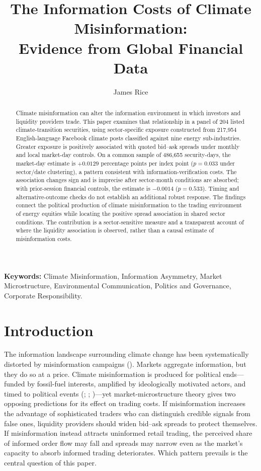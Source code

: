 \documentclass{article}
\title{The Information Costs of Climate Misinformation: \\\large Evidence from Global Financial Data}
\author[1]{James Rice}
\affil[1]{Department of Government, University of Essex}
\author{}
\date{}
\theoremstyle{plain}
\begin{document}
\maketitle

\begin{abstract}

Climate misinformation can alter the information environment in which investors and liquidity providers trade. This paper examines that relationship in a panel of 204 listed climate-transition securities, using sector-specific exposure constructed from 217,954 English-language Facebook climate posts classified against nine energy sub-industries. Greater exposure is positively associated with quoted bid--ask spreads under monthly and local market-day controls. On a common sample of 486,655 security-days, the market-day estimate is $+0.0129$ percentage points per index point ($p=0.033$ under sector/date clustering), a pattern consistent with information-verification costs. The association changes sign and is imprecise after sector-month conditions are absorbed; with prior-session financial controls, the estimate is $-0.0014$ ($p=0.533$). Timing and alternative-outcome checks do not establish an additional robust response. The findings connect the political production of climate misinformation to the trading environment of energy equities while locating the positive spread association in shared sector conditions. The contribution is a sector-sensitive measure and a transparent account of where the liquidity association is observed, rather than a causal estimate of misinformation costs.
\end{abstract}

\noindent\textbf{Keywords:} Climate Misinformation, Information Asymmetry, Market Microstructure, Environmental Communication, Politics and Governance, Corporate Responsibility.

\section{Introduction}

The information landscape surrounding climate change has been systematically distorted by misinformation campaigns (\cite{cobb2025politics}). Markets aggregate information, but they do so at a price. Climate misinformation is produced for political ends---funded by fossil-fuel interests, amplified by ideologically motivated actors, and timed to political events (\cite{farrell2016network}; \cite{oreskes2010merchants}; \cite{cinelli2021echo})---yet market-microstructure theory gives two opposing predictions for its effect on trading costs. If misinformation increases the advantage of sophisticated traders who can distinguish credible signals from false ones, liquidity providers should widen bid--ask spreads to protect themselves. If misinformation instead attracts uninformed retail trading, the perceived share of informed order flow may fall and spreads may narrow even as the market's capacity to absorb informed trading deteriorates. Which pattern prevails is the central question of this paper.
\end{document}
